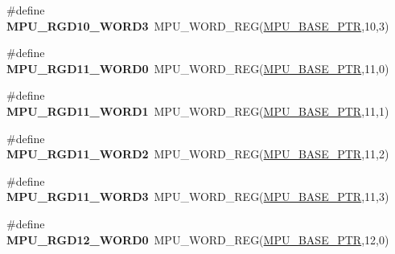 \begin{DoxyCompactItemize}
\item 
\hypertarget{group___m_p_u___register___accessor___macros_ga1d3aa87e2dc136a6a93c84874093c013}{}\#define {\bfseries M\+P\+U\+\_\+\+R\+G\+D10\+\_\+\+W\+O\+R\+D3}~M\+P\+U\+\_\+\+W\+O\+R\+D\+\_\+\+R\+E\+G(\hyperlink{group___m_p_u___peripheral_gae2d60f80178d84225d77e5f0214d1f1d}{M\+P\+U\+\_\+\+B\+A\+S\+E\+\_\+\+P\+T\+R},10,3)\label{group___m_p_u___register___accessor___macros_ga1d3aa87e2dc136a6a93c84874093c013}

\item 
\hypertarget{group___m_p_u___register___accessor___macros_gacf3b36d8188270dcf2409cdebd061d6a}{}\#define {\bfseries M\+P\+U\+\_\+\+R\+G\+D11\+\_\+\+W\+O\+R\+D0}~M\+P\+U\+\_\+\+W\+O\+R\+D\+\_\+\+R\+E\+G(\hyperlink{group___m_p_u___peripheral_gae2d60f80178d84225d77e5f0214d1f1d}{M\+P\+U\+\_\+\+B\+A\+S\+E\+\_\+\+P\+T\+R},11,0)\label{group___m_p_u___register___accessor___macros_gacf3b36d8188270dcf2409cdebd061d6a}

\item 
\hypertarget{group___m_p_u___register___accessor___macros_gaf3c09ad359359a3504efdd0320f16647}{}\#define {\bfseries M\+P\+U\+\_\+\+R\+G\+D11\+\_\+\+W\+O\+R\+D1}~M\+P\+U\+\_\+\+W\+O\+R\+D\+\_\+\+R\+E\+G(\hyperlink{group___m_p_u___peripheral_gae2d60f80178d84225d77e5f0214d1f1d}{M\+P\+U\+\_\+\+B\+A\+S\+E\+\_\+\+P\+T\+R},11,1)\label{group___m_p_u___register___accessor___macros_gaf3c09ad359359a3504efdd0320f16647}

\item 
\hypertarget{group___m_p_u___register___accessor___macros_ga07c73c6b39c56a07687d92ea808d3a95}{}\#define {\bfseries M\+P\+U\+\_\+\+R\+G\+D11\+\_\+\+W\+O\+R\+D2}~M\+P\+U\+\_\+\+W\+O\+R\+D\+\_\+\+R\+E\+G(\hyperlink{group___m_p_u___peripheral_gae2d60f80178d84225d77e5f0214d1f1d}{M\+P\+U\+\_\+\+B\+A\+S\+E\+\_\+\+P\+T\+R},11,2)\label{group___m_p_u___register___accessor___macros_ga07c73c6b39c56a07687d92ea808d3a95}

\item 
\hypertarget{group___m_p_u___register___accessor___macros_ga32cf06f5c5696a816be177c6fa4116d1}{}\#define {\bfseries M\+P\+U\+\_\+\+R\+G\+D11\+\_\+\+W\+O\+R\+D3}~M\+P\+U\+\_\+\+W\+O\+R\+D\+\_\+\+R\+E\+G(\hyperlink{group___m_p_u___peripheral_gae2d60f80178d84225d77e5f0214d1f1d}{M\+P\+U\+\_\+\+B\+A\+S\+E\+\_\+\+P\+T\+R},11,3)\label{group___m_p_u___register___accessor___macros_ga32cf06f5c5696a816be177c6fa4116d1}

\item 
\hypertarget{group___m_p_u___register___accessor___macros_ga19d1717783edff6bddcc023378a345cb}{}\#define {\bfseries M\+P\+U\+\_\+\+R\+G\+D12\+\_\+\+W\+O\+R\+D0}~M\+P\+U\+\_\+\+W\+O\+R\+D\+\_\+\+R\+E\+G(\hyperlink{group___m_p_u___peripheral_gae2d60f80178d84225d77e5f0214d1f1d}{M\+P\+U\+\_\+\+B\+A\+S\+E\+\_\+\+P\+T\+R},12,0)\label{group___m_p_u___register___accessor___macros_ga19d1717783edff6bddcc023378a345cb}


\end{DoxyCompactItemize}
